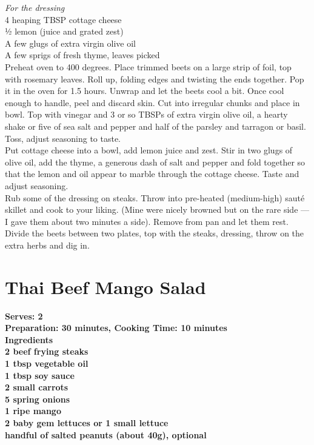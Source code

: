 \documentclass[18pt, oneside]{book}
\begin{document}
\textit{For the dressing} \\
4 heaping TBSP cottage cheese \\
½ lemon (juice and grated zest) \\
A few glugs of extra virgin olive oil \\
A few sprigs of fresh thyme, leaves picked \\

Preheat oven to 400 degrees. Place trimmed beets on a large strip of foil, top with rosemary leaves. Roll up, folding edges and twisting the ends together. Pop it in the oven for 1.5 hours. Unwrap and let the beets cool a bit. Once cool enough to handle, peel and discard skin. Cut into irregular chunks and place in bowl. Top with vinegar and 3 or so TBSPs of extra virgin olive oil, a hearty shake or five of sea salt and pepper and half of the parsley and tarragon or basil. Toss, adjust seasoning to taste. \\

Put cottage cheese into a bowl, add lemon juice and zest. Stir in two glugs of olive oil, add the thyme, a generous dash of salt and pepper and fold together so that the lemon and oil appear to marble through the cottage cheese. Taste and adjust seasoning. \\

Rub some of the dressing on steaks. Throw into pre-heated (medium-high) sauté skillet and cook to your liking. (Mine were nicely browned but on the rare side — I gave them about two minutes a side). Remove from pan and let them rest. \\

Divide the beets between two plates, top with the steaks, dressing, throw on the extra herbs and dig in.

\section{Thai Beef Mango Salad}
\bf{Serves: 2} \\
\bf{Preparation: 30 minutes, Cooking Time: 10 minutes} \\

\bf{Ingredients} \normalfont \\
2 beef frying steaks \\
1 tbsp vegetable oil \\
1 tbsp soy sauce \\
2 small carrots \\
5 spring onions \\
1 ripe mango \\
2 baby gem lettuces or 1 small lettuce \\
handful of salted peanuts (about 40g), optional \\
\end{document}
